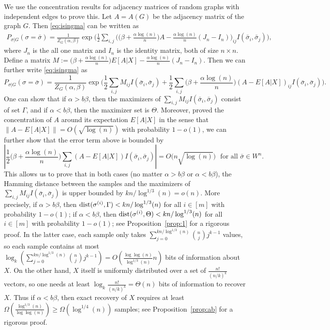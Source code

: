 \documentclass{article}
\begin{document}
We use the concentration results for adjacency matrices of random graphs with independent edges to prove this. Let $A=A(G)$ be the adjacency matrix of the graph $G$. Then \eqref{eq:isingma} can be written as
\begin{align*}
 P_{\sigma|G}(\sigma=\bar{\sigma})  
=  \frac{1}{Z_G(\alpha,\beta)}
\exp\Big( \frac{1}{2} \sum_{i,j}\Big( \big(\beta+\frac{\alpha\log(n)}{n} \big) A
-\frac{\alpha\log(n)}{n} (J_n-I_n) \Big)_{ij} I(\bar{\sigma}_i,\bar{\sigma}_j) 
\Big)  ,
\end{align*}
where $J_n$ is the all one matrix and $I_n$ is the identity matrix, both of size $n\times n$.
Define a matrix
$
M:= \big(\beta+\frac{\alpha\log(n)}{n} \big) E[A|X]
-\frac{\alpha\log(n)}{n} (J_n-I_n).
$
Then we can further write \eqref{eq:isingma}
as
$$
P_{\sigma|G}(\sigma=\bar{\sigma})
= \frac{1}{Z_G(\alpha,\beta)}
\exp\Big( \frac{1}{2} \sum_{i,j} M_{ij} I(\bar{\sigma}_i, \bar{\sigma}_j) + \frac{1}{2} \sum_{i,j}\big(\beta+\frac{\alpha\log(n)}{n} \big)  (A-E[A|X])_{ij} I(\bar{\sigma}_i, \bar{\sigma}_j) 
\Big)  .
$$
One can show that if $\alpha>b\beta$, then the maximizers of $\sum_{i,j} M_{ij} I(\bar{\sigma}_i, \bar{\sigma}_j)$ consist of set $\Gamma$, and if $\alpha<b\beta$, then the maximizer set is $\Theta$.
Moreover, \cite{Hajek16} proved the concentration of $A$ around its expectation $E[A|X]$ in the sense that
$\|A-E[A|X]\| = O(\sqrt{\log(n)})$ with probability $1-o(1)$, we can further show that the error term above is bounded by
$$
\left|\frac{1}{2} \big(\beta+\frac{\alpha\log(n)}{n} \big)\sum_{i,j} (A-E[A|X])
 I( \bar{\sigma}_i, \bar{\sigma}_j) \right| = O \big( n \sqrt{\log(n)} \big)
  \text{~~for all~} \bar{\sigma}\in W^n  .
$$
This allows us to prove that in both cases (no matter $\alpha>b\beta$ or $\alpha<b\beta$), the Hamming distance between the samples and the maximizers of $\sum_{i,j}  M_{ij}I(\bar{\sigma}_i, \bar{\sigma}_j)$ is upper bounded by $kn/\log^{1/3}(n)=o(n)$.
More precisely, if $\alpha>b\beta$, then $\operatorname{dist}(\sigma^{(i)},\Gamma )< kn/\log^{1/3}(n)$ for all $i\in[m]$ with probability $1-o(1)$; if $\alpha<b\beta$, then $\operatorname{dist}(\sigma^{(i)}, \Theta)< kn/\log^{1/3}(n)$ for all $i\in[m]$ with probability $1-o(1)$; see Proposition~\ref{prop:1} for a rigorous proof.
In the latter case, each sample only takes $\sum_{j=0}^{kn/\log^{1/3}(n)}\binom{n}{j}j^{k-1}$ values, so each sample contains at most $\log_k(\sum_{j=0}^{kn/\log^{1/3}(n)}\binom{n}{j}j^{k-1})=O(\frac{\log\log(n)}{\log^{1/3}(n)} n)$ bits of information about $X$. On the other hand, $X$ itself is uniformly distributed over a set of $\frac{n!}{(n/k)^k}$ vectors, so one needs at least $\log_k\frac{n!}{(n/k)^k}=\Theta(n)$ bits of information to recover $X$. Thus if $\alpha<b\beta$, then exact recovery of $X$ requires at least $\Omega(\frac{\log^{1/3}(n)}{\log\log(n)})\ge \Omega(\log^{1/4}(n))$ samples; see Proposition~\ref{prop:ab} for a rigorous proof.
\end{document}
